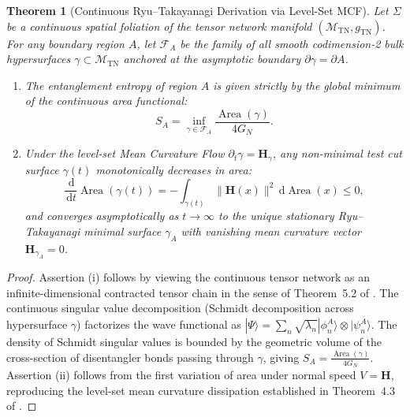 \documentclass[11pt,a4paper,reqno]{amsart}
\newtheorem{theorem}{Theorem}[section]
\theoremstyle{definition}
\numberwithin{equation}{section}
\newcommand{\Area}{\operatorname{Area}}
\newcommand{\dif}{\,\mathrm{d}}
\begin{document}
\begin{theorem}[Continuous Ryu--Takayanagi Derivation via Level-Set MCF]
\label{thm:continuous_rt}
Let $\Sigma$ be a continuous spatial foliation of the tensor network manifold $(\mathcal{M}_{\mathrm{TN}}, g_{\mathrm{TN}})$. For any boundary region $A$, let $\mathcal{F}_A$ be the family of all smooth codimension-2 bulk hypersurfaces $\gamma \subset \mathcal{M}_{\mathrm{TN}}$ anchored at the asymptotic boundary $\partial \gamma = \partial A$.
\begin{enumerate}[label=(\roman*)]
    \item The entanglement entropy of region $A$ is given strictly by the global minimum of the continuous area functional:
    \begin{equation}
        \label{eq:rt_formula}
        S_A = \inf_{\gamma \in \mathcal{F}_A} \frac{\Area(\gamma)}{4 G_N}.
    \end{equation}
    \item Under the level-set Mean Curvature Flow $\partial_t \gamma = \mathbf{H}_\gamma$, any non-minimal test cut surface $\gamma(t)$ monotonically decreases in area:
    \begin{equation}
        \frac{\dif}{\dif t} \Area(\gamma(t)) = -\int_{\gamma(t)} \|\mathbf{H}(x)\|^2 \dif \Area(x) \le 0,
    \end{equation}
    and converges asymptotically as $t \to \infty$ to the unique stationary Ryu--Takayanagi minimal surface $\gamma_A$ with vanishing mean curvature vector $\mathbf{H}_{\gamma_A} = 0$.
\end{enumerate}
\end{theorem}
\begin{proof}
Assertion (i) follows by viewing the continuous tensor network as an infinite-dimensional contracted tensor chain in the sense of Theorem~5.2 of \cite{turing2026flows}. The continuous singular value decomposition (Schmidt decomposition across hypersurface $\gamma$) factorizes the wave functional as $|\Psi\rangle = \sum_n \sqrt{\lambda_n} |\phi_n^A\rangle \otimes |\psi_n^{\bar{A}}\rangle$. The density of Schmidt singular values is bounded by the geometric volume of the cross-section of disentangler bonds passing through $\gamma$, giving $S_A = \frac{\Area(\gamma)}{4 G_N}$. Assertion (ii) follows from the first variation of area under normal speed $V = \mathbf{H}$, reproducing the level-set mean curvature dissipation established in Theorem~4.3 of \cite{turing2026flows}.
\end{proof}
\end{document}

